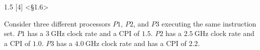 \documentclass[paper=a4, fontsize=11pt]{scrartcl} %
\begin{document}
\maketitle %

\section{}

\begin{fancyquotes}
  1.5 [4] <§1.6>

  Consider three different processors $P1$, $P2$, and $P3$ executing
  the same instruction set. $P1$ has a $\SI{3}{\giga\hertz}$ clock
  rate and a CPI of $1.5$. $P2$ has a $\SI{2.5}{\giga\hertz}$ clock
  rate and a CPI of $1.0$. $P3$ has a $\SI{4.0}{\giga\hertz}$ clock
  rate and has a CPI of $2.2$.
\end{fancyquotes}
\end{document}
